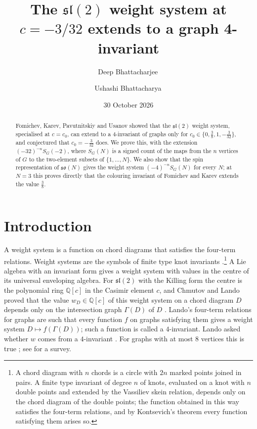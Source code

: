 \documentclass[11pt,a4paper,reqno]{amsart}
\title[The $\mathfrak{sl}(2)$ weight system at $c=-3/32$]{The $\mathfrak{sl}(2)$ weight system at $c=-3/32$ extends to a graph 4-invariant}
\author{Deep Bhattacharjee\,\orcidlink{0000-0003-0466-750X}}
\author{Ushashi Bhattacharya\,\orcidlink{0009-0002-2254-3914}}
\date{30 October 2026}
\theoremstyle{definition}
\newcommand{\Q}{\mathbb{Q}}
\newcommand{\slt}{\mathfrak{sl}(2)}
\begin{document}
\begin{abstract}
Fomichev, Karev, Pavutnitskiy and Usanov showed that the $\mathfrak{sl}(2)$ weight system, specialised at $c=c_0$, can extend to a $4$-invariant of graphs only for $c_0\in\{0,\frac38,1,-\frac{3}{32}\}$, and conjectured that $c_0=-\frac{3}{32}$ does. We prove this, with the extension $(-32)^{-n}S_G(-2)$, where $S_G(N)$ is a signed count of the maps from the $n$ vertices of $G$ to the two-element subsets of $\{1,\dots,N\}$. We also show that the spin representation of $\mathfrak{so}(N)$ gives the weight system $(-4)^{-n}S_G(N)$ for every $N$; at $N=3$ this proves directly that the colouring invariant of Fomichev and Karev extends the value $\frac38$.
\end{abstract}

\maketitle





\section{Introduction}\label{sec:intro}

A weight system is a function on chord diagrams that satisfies the four-term relations. Weight systems are the symbols of finite type knot invariants \cite{Kon93,BN95,CDM12}.\footnote{A chord diagram with $n$ chords is a circle with $2n$ marked points joined in pairs. A finite type invariant of degree $n$ of knots, evaluated on a knot with $n$ double points and extended by the Vassiliev skein relation, depends only on the chord diagram of the double points; the function obtained in this way satisfies the four-term relations, and by Kontsevich's theorem every function satisfying them arises so.} A Lie algebra with an invariant form gives a weight system with values in the centre of its universal enveloping algebra. For $\slt$ with the Killing form the centre is the polynomial ring $\Q[c]$ in the Casimir element $c$, and Chmutov and Lando proved that the value $w_D\in\Q[c]$ of this weight system on a chord diagram $D$ depends only on the intersection graph $\Gamma(D)$ of $D$ \cite{ChL07}. Lando's four-term relations for graphs \cite{Lan00} are such that every function $f$ on graphs satisfying them gives a weight system $D\mapsto f(\Gamma(D))$; such a function is called a $4$-invariant. Lando asked whether $w$ comes from a $4$-invariant \cite{ChL07}. For graphs with at most $8$ vertices this is true \cite{Kra21}; see \cite{KL22} for a survey.
\end{document}
